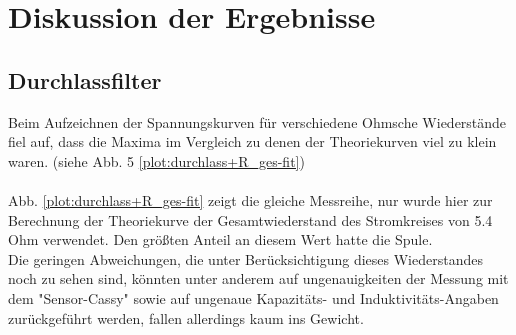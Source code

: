\section{Diskussion der Ergebnisse}

\subsection{Durchlassfilter}
Beim Aufzeichnen der Spannungskurven für verschiedene Ohmsche Wiederstände fiel auf, dass die Maxima im Vergleich zu denen der Theoriekurven viel zu klein waren. (siehe Abb. 5 \ref{plot:durchlass+R_ges-fit})
\paragraph{}Abb. \ref{plot:durchlass+R_ges-fit} zeigt die gleiche Messreihe, nur wurde hier zur Berechnung der Theoriekurve der Gesamtwiederstand des Stromkreises von 5.4 Ohm verwendet. Den größten Anteil an diesem Wert hatte die Spule.\\
Die geringen Abweichungen, die unter Berücksichtigung dieses Wiederstandes noch zu sehen sind, könnten unter anderem auf ungenauigkeiten der Messung mit dem "Sensor-Cassy" sowie auf ungenaue Kapazitäts- und Induktivitäts-Angaben zurückgeführt werden, fallen allerdings kaum ins Gewicht.
